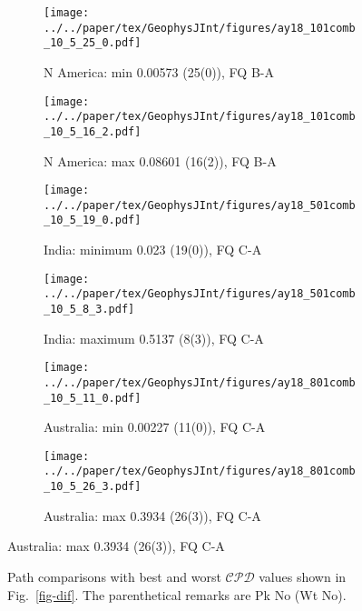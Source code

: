 \begin{figure}[tbp]
  \centering
  \begin{subfigure}{.42\textwidth} %
    \texttt{[image: ../../paper/tex/GeophysJInt/figures/ay18\_101comb\_10\_5\_25\_0.pdf]}
    \caption{N America: min 0.00573 (25(0)), FQ
      B-A}\label{fig-nac-105250}
  \end{subfigure}
  \begin{subfigure}{.43\textwidth} %
    \texttt{[image: ../../paper/tex/GeophysJInt/figures/ay18\_101comb\_10\_5\_16\_2.pdf]}
    \caption{N America: max 0.08601 (16(2)), FQ
      B-A}\label{fig-nac-105162}
  \end{subfigure}
  \vspace{.1em}
  \begin{subfigure}{.42\textwidth}
    \texttt{[image: ../../paper/tex/GeophysJInt/figures/ay18\_501comb\_10\_5\_19\_0.pdf]}
    \caption{India: minimum 0.023 (19(0)), FQ C-A}\label{fig-ind-105190}
  \end{subfigure}
  \begin{subfigure}{.42\textwidth}
    \texttt{[image: ../../paper/tex/GeophysJInt/figures/ay18\_501comb\_10\_5\_8\_3.pdf]}
    \caption{India: maximum 0.5137 (8(3)), FQ C-A}\label{fig-ind-10583}
  \end{subfigure}
  \vspace{.1em}
  \begin{subfigure}{.42\textwidth}
    \texttt{[image: ../../paper/tex/GeophysJInt/figures/ay18\_801comb\_10\_5\_11\_0.pdf]}
    \caption{Australia: min 0.00227 (11(0)), FQ C-A}\label{fig-au-105110}
  \end{subfigure}
  \begin{subfigure}{.42\textwidth}
    \texttt{[image: ../../paper/tex/GeophysJInt/figures/ay18\_801comb\_10\_5\_26\_3.pdf]}
    \caption{Australia: max 0.3934 (26(3)), FQ C-A}\label{fig-au-105263}
  \end{subfigure}
\end{figure}
\begin{figure}[!ht]
  \ContinuedFloat\caption[Best and worst $\mathcal{CPD}$s (10/5 Myr window/step)]{Path
    comparisons with best and worst $\mathcal{CPD}$ values shown in
    Fig.~\ref{fig-dif}. The parenthetical remarks are Pk No (Wt No).}\label{fig-difbw}
\end{figure}

